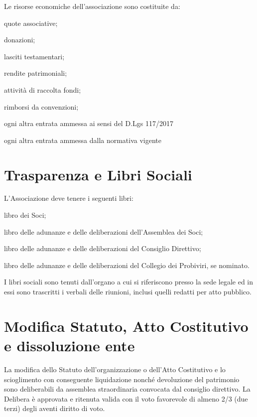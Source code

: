 \documentclass[legalpaper, 11pt]{exam}
\let\tempone\enumerate
\let\temptwo\endenumerate
\renewenvironment{enumerate}{\tempone\addtolength{\itemsep}{-0.45\baselineskip}}{\temptwo}
\begin{document}
{\begin{enumerate}
 \item Le risorse economiche dell'associazione sono costituite da:
 \vspace{-5pt}
 \begin{enumerate}
  \item quote associative;
  \item donazioni;
  \item lasciti testamentari;
  \item rendite patrimoniali;
  \item attività di raccolta fondi;
  \item rimborsi da convenzioni;
  \item ogni altra entrata ammessa ai sensi del D.Lgs 117/2017
  \item ogni altra entrata ammessa dalla normativa vigente
 \end{enumerate}
\end{enumerate}


\section{Trasparenza e Libri Sociali}
\begin{enumerate}
 \item L'Associazione deve tenere i seguenti libri: 
 \vspace{-5pt}
 \begin{enumerate}
  \item libro dei Soci;
  \item libro delle adunanze e delle deliberazioni dell'Assemblea dei Soci;
  \item libro delle adunanze e delle deliberazioni del Consiglio Direttivo;
  \item libro delle adunanze e delle deliberazioni del Collegio dei Probiviri, se nominato.
 \end{enumerate}
 
 \item I libri sociali sono tenuti dall'organo a cui si riferiscono presso la sede legale ed in essi sono trascritti i verbali delle riunioni, inclusi quelli redatti per atto pubblico.
\end{enumerate}

\section{Modifica Statuto, Atto Costitutivo e dissoluzione ente}
\begin{enumerate}
\item La modifica dello Statuto dell’organizzazione o dell’Atto Costitutivo e lo scioglimento con conseguente liquidazione nonché devoluzione del patrimonio sono deliberabili da assemblea straordinaria convocata dal consiglio direttivo. La Delibera è approvata e ritenuta valida con il voto favorevole di almeno 2/3 (due terzi) degli aventi diritto di voto.
\end{enumerate}

}
\end{document}
